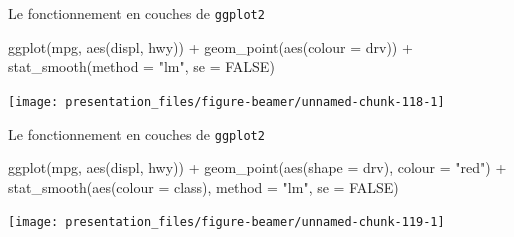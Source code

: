 \documentclass[12pt,ignorenonframetext,handout,]{beamer}
\newenvironment{Shaded}{}{}
\newcommand{\DataTypeTok}[1]{#1}
\newcommand{\KeywordTok}[1]{\textcolor[rgb]{0.00,0.00,1.00}{#1}}
\newcommand{\NormalTok}[1]{#1}
\newcommand{\OperatorTok}[1]{#1}
\newcommand{\OtherTok}[1]{\textcolor[rgb]{1.00,0.25,0.00}{#1}}
\newcommand{\StringTok}[1]{\textcolor[rgb]{0.00,0.50,0.50}{#1}}
\renewenvironment{Shaded}{\begin{snugshade}}{\end{snugshade}}
\begin{document}
\begin{frame}[fragile]{\large Le fonctionnement en \og couches \fg{} de
\texttt{ggplot2}}
\protect\hypertarget{le-fonctionnement-en-couches-de-ggplot2-6}{}

\footnotesize \center

\begin{Shaded}
\begin{Highlighting}[]
\KeywordTok{ggplot}\NormalTok{(mpg, }\KeywordTok{aes}\NormalTok{(displ, hwy)) }\OperatorTok{+}\StringTok{ }
\StringTok{  }\KeywordTok{geom_point}\NormalTok{(}\KeywordTok{aes}\NormalTok{(}\DataTypeTok{colour =}\NormalTok{ drv)) }\OperatorTok{+}\StringTok{ }
\StringTok{  }\KeywordTok{stat_smooth}\NormalTok{(}\DataTypeTok{method =} \StringTok{"lm"}\NormalTok{, }\DataTypeTok{se =} \OtherTok{FALSE}\NormalTok{)}
\end{Highlighting}
\end{Shaded}

\texttt{[image: presentation\_files/figure-beamer/unnamed-chunk-118-1]}

\end{frame}

\begin{frame}[fragile]{\large Le fonctionnement en \og couches \fg{} de
\texttt{ggplot2}}
\protect\hypertarget{le-fonctionnement-en-couches-de-ggplot2-7}{}

\footnotesize \center

\begin{Shaded}
\begin{Highlighting}[]
\KeywordTok{ggplot}\NormalTok{(mpg, }\KeywordTok{aes}\NormalTok{(displ, hwy)) }\OperatorTok{+}\StringTok{ }
\StringTok{  }\KeywordTok{geom_point}\NormalTok{(}\KeywordTok{aes}\NormalTok{(}\DataTypeTok{shape =}\NormalTok{ drv), }\DataTypeTok{colour =} \StringTok{"red"}\NormalTok{) }\OperatorTok{+}\StringTok{ }
\StringTok{  }\KeywordTok{stat_smooth}\NormalTok{(}\KeywordTok{aes}\NormalTok{(}\DataTypeTok{colour =}\NormalTok{ class), }\DataTypeTok{method =} \StringTok{"lm"}\NormalTok{, }\DataTypeTok{se =} \OtherTok{FALSE}\NormalTok{)}
\end{Highlighting}
\end{Shaded}

\texttt{[image: presentation\_files/figure-beamer/unnamed-chunk-119-1]}

\end{frame}
\end{document}
